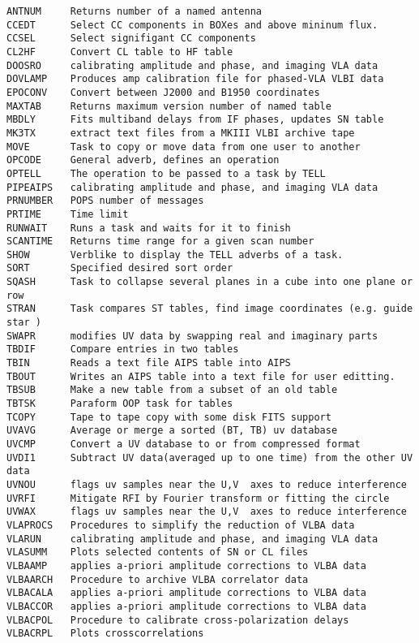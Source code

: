 \vskip 0.5pt
\bbve\begin{verbatim}
ANTNUM     Returns number of a named antenna
CCEDT      Select CC components in BOXes and above mininum flux.
CCSEL      Select signifigant CC components
CL2HF      Convert CL table to HF table
DOOSRO     calibrating amplitude and phase, and imaging VLA data
DOVLAMP    Produces amp calibration file for phased-VLA VLBI data
EPOCONV    Convert between J2000 and B1950 coordinates
MAXTAB     Returns maximum version number of named table
MBDLY      Fits multiband delays from IF phases, updates SN table
MK3TX      extract text files from a MKIII VLBI archive tape
MOVE       Task to copy or move data from one user to another
OPCODE     General adverb, defines an operation
OPTELL     The operation to be passed to a task by TELL
PIPEAIPS   calibrating amplitude and phase, and imaging VLA data
PRNUMBER   POPS number of messages
PRTIME     Time limit
RUNWAIT    Runs a task and waits for it to finish
SCANTIME   Returns time range for a given scan number
SHOW       Verblike to display the TELL adverbs of a task.
SORT       Specified desired sort order
SQASH      Task to collapse several planes in a cube into one plane or row
STRAN      Task compares ST tables, find image coordinates (e.g. guide star )
SWAPR      modifies UV data by swapping real and imaginary parts
TBDIF      Compare entries in two tables
TBIN       Reads a text file AIPS table into AIPS
TBOUT      Writes an AIPS table into a text file for user editting.
TBSUB      Make a new table from a subset of an old table
TBTSK      Paraform OOP task for tables
TCOPY      Tape to tape copy with some disk FITS support
UVAVG      Average or merge a sorted (BT, TB) uv database
UVCMP      Convert a UV database to or from compressed format
UVDI1      Subtract UV data(averaged up to one time) from the other UV data
UVNOU      flags uv samples near the U,V  axes to reduce interference
UVRFI      Mitigate RFI by Fourier transform or fitting the circle
UVWAX      flags uv samples near the U,V  axes to reduce interference
VLAPROCS   Procedures to simplify the reduction of VLBA data
VLARUN     calibrating amplitude and phase, and imaging VLA data
VLASUMM    Plots selected contents of SN or CL files
VLBAAMP    applies a-priori amplitude corrections to VLBA data
VLBAARCH   Procedure to archive VLBA correlator data
VLBACALA   applies a-priori amplitude corrections to VLBA data
VLBACCOR   applies a-priori amplitude corrections to VLBA data
VLBACPOL   Procedure to calibrate cross-polarization delays
VLBACRPL   Plots crosscorrelations

\end{verbatim}

